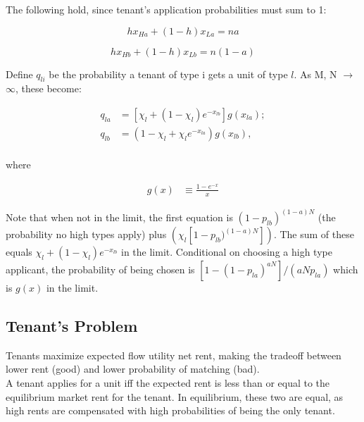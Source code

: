 \documentclass{article}
\begin{document}
The following hold, since tenant's application probabilities must sum to 1:

\begin{equation*}
    hx_{Ha} + (1-h)x_{La} = na
\end{equation*}

\begin{equation*}
    hx_{Hb} + (1-h)x_{Lb} = n(1-a)
\end{equation*}

Define $q_{li}$ be the probability a tenant of type i gets a unit of type $l$. As M, N $\rightarrow$ $\infty$, these become:

\begin{align*}
q_{la} &= \left[\chi_l + (1 - \chi_l)e^{-x_{lb}}\right] g(x_{la}); \\
q_{lb} &= \left(1 - \chi_l + \chi_l e^{-x_{la}}\right) g(x_{lb}), \\
\end{align*}

where

\begin{align*}
    g(x) &\equiv \frac{1 - e^{-x}}{x}
\end{align*}

Note that when not in the limit, the first equation is $(1 - p_{lb})^{(1-a)N}$ (the probability no high types apply) plus $(\chi_l[1- p_{lb})^{(1-a)N}])$. The sum of these equals $\chi_l + (1 - \chi_l)e^{-x_{lb}}$ in the limit. Conditional on choosing a high type applicant, the probability of being chosen is $\left[1 - (1 - p_{la})^{aN} \right] / (aN p_{la})$
which is $g(x)$ in the limit.

\subsection{Tenant's Problem}
Tenants maximize expected flow utility net rent, making the tradeoff between lower rent (good) and lower probability of matching (bad).\\

A tenant applies for a unit iff the expected rent is less than or equal to the equilibrium market rent for the tenant. In equilibrium, these two are equal, as high rents are compensated with high probabilities of being the only tenant.\\

\end{document}
